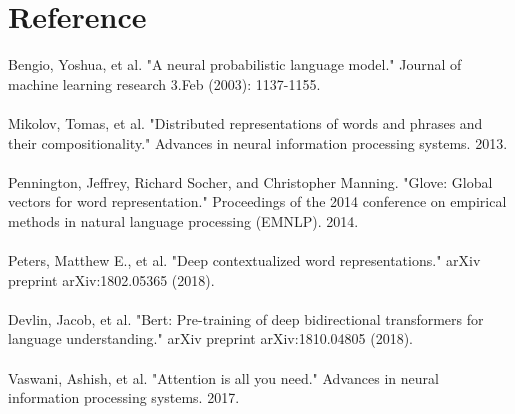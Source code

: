 \documentclass[paper=a4, fontsize=12pt]{scrartcl}
\begin{document}
\section{Reference}
Bengio, Yoshua, et al. "A neural probabilistic language model." Journal of machine learning research 3.Feb (2003): 1137-1155.\\\\
Mikolov, Tomas, et al. "Distributed representations of words and phrases and their compositionality." Advances in neural information processing systems. 2013.\\\\
Pennington, Jeffrey, Richard Socher, and Christopher Manning. "Glove: Global vectors for word representation." Proceedings of the 2014 conference on empirical methods in natural language processing (EMNLP). 2014. \\\\
Peters, Matthew E., et al. "Deep contextualized word representations." arXiv preprint arXiv:1802.05365 (2018).\\\\
Devlin, Jacob, et al. "Bert: Pre-training of deep bidirectional transformers for language understanding." arXiv preprint arXiv:1810.04805 (2018).\\\\
Vaswani, Ashish, et al. "Attention is all you need." Advances in neural information processing systems. 2017.
\end{document}
